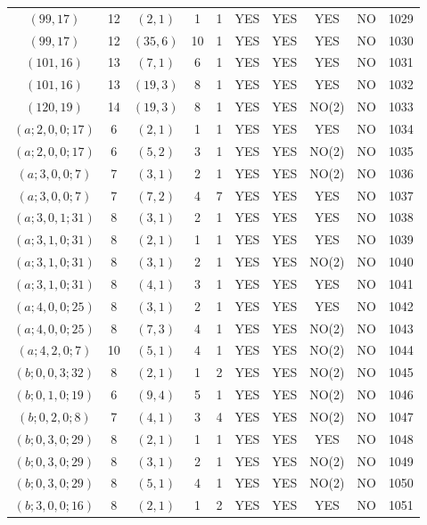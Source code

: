 \begin{longtable}{|c|c|c|c|c|c|c|c|c|c|}
$(99, 17)$ & 12 & $(2, 1)$ & 1 & 1 & YES & YES & YES & NO & 1029\\
$(99, 17)$ & 12 & $(35, 6)$ & 10 & 1 & YES & YES & YES & NO & 1030\\
$(101, 16)$ & 13 & $(7, 1)$ & 6 & 1 & YES & YES & YES & NO & 1031\\
$(101, 16)$ & 13 & $(19, 3)$ & 8 & 1 & YES & YES & YES & NO & 1032\\
$(120, 19)$ & 14 & $(19, 3)$ & 8 & 1 & YES & YES & NO(2) & NO & 1033\\
$(a; 2, 0, 0; 17)$ & 6 & $(2, 1)$ & 1 & 1 & YES & YES & YES & NO & 1034\\
$(a; 2, 0, 0; 17)$ & 6 & $(5, 2)$ & 3 & 1 & YES & YES & NO(2) & NO & 1035\\
$(a; 3, 0, 0; 7)$ & 7 & $(3, 1)$ & 2 & 1 & YES & YES & NO(2) & NO & 1036\\
$(a; 3, 0, 0; 7)$ & 7 & $(7, 2)$ & 4 & 7 & YES & YES & YES & NO & 1037\\
$(a; 3, 0, 1; 31)$ & 8 & $(3, 1)$ & 2 & 1 & YES & YES & YES & NO & 1038\\
$(a; 3, 1, 0; 31)$ & 8 & $(2, 1)$ & 1 & 1 & YES & YES & YES & NO & 1039\\
$(a; 3, 1, 0; 31)$ & 8 & $(3, 1)$ & 2 & 1 & YES & YES & NO(2) & NO & 1040\\
$(a; 3, 1, 0; 31)$ & 8 & $(4, 1)$ & 3 & 1 & YES & YES & YES & NO & 1041\\
$(a; 4, 0, 0; 25)$ & 8 & $(3, 1)$ & 2 & 1 & YES & YES & YES & NO & 1042\\
$(a; 4, 0, 0; 25)$ & 8 & $(7, 3)$ & 4 & 1 & YES & YES & NO(2) & NO & 1043\\
$(a; 4, 2, 0; 7)$ & 10 & $(5, 1)$ & 4 & 1 & YES & YES & NO(2) & NO & 1044\\
$(b; 0, 0, 3; 32)$ & 8 & $(2, 1)$ & 1 & 2 & YES & YES & NO(2) & NO & 1045\\
$(b; 0, 1, 0; 19)$ & 6 & $(9, 4)$ & 5 & 1 & YES & YES & NO(2) & NO & 1046\\
$(b; 0, 2, 0; 8)$ & 7 & $(4, 1)$ & 3 & 4 & YES & YES & NO(2) & NO & 1047\\
$(b; 0, 3, 0; 29)$ & 8 & $(2, 1)$ & 1 & 1 & YES & YES & YES & NO & 1048\\
$(b; 0, 3, 0; 29)$ & 8 & $(3, 1)$ & 2 & 1 & YES & YES & NO(2) & NO & 1049\\
$(b; 0, 3, 0; 29)$ & 8 & $(5, 1)$ & 4 & 1 & YES & YES & NO(2) & NO & 1050\\
$(b; 3, 0, 0; 16)$ & 8 & $(2, 1)$ & 1 & 2 & YES & YES & YES & NO & 1051\\

\end{longtable}
